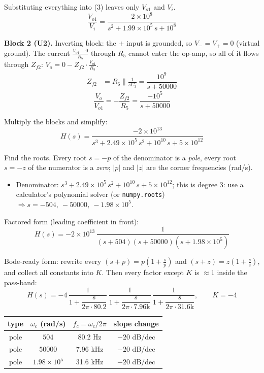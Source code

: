 \documentclass[11pt]{article}
\newcommand{\solstep}[2]{\par\medskip{\color{stepc}\textbf{Step #1 --- #2}}\par\nopagebreak}
\begin{document}
Substituting everything into (3) leaves only $V_{o1}$ and $V_i$.\[
\frac{V_{o1}}{V_i} = \dfrac{2\times 10^{8}}{s^{2} + 1.99\times 10^{5}\,s + 10^{8}}
\]

\textbf{Block 2 (U2).} Inverting block: the $+$ input is grounded, so $V_- = V_+ = 0$ (virtual ground). The current $\frac{V_{o1} - 0}{R_{5}}$ through $R_{5}$ cannot enter the op-amp, so all of it flows through $Z_{f2}$: $V_{o} = 0 - Z_{f2}\cdot\frac{V_{o1}}{R_{5}}$.\begin{align*}
Z_{f2} &= R_{6} \parallel \frac{1}{sC_{3}} = \dfrac{10^{9}}{s + 50000}
\end{align*}
\[
\frac{V_{o}}{V_{o1}} = -\frac{Z_{f2}}{R_{5}} = \dfrac{-10^{5}}{s + 50000}
\]

Multiply the blocks and simplify:\[
H(s) = \dfrac{-2\times 10^{13}}{s^{3} + 2.49\times 10^{5}\,s^{2} + 10^{10}\,s + 5\times 10^{12}}
\]

\solstep{5}{Standard (Bode-ready) form}Find the roots. Every root $s=-p$ of the denominator is a \emph{pole}, every root $s=-z$ of the numerator is a \emph{zero}; $|p|$ and $|z|$ are the corner frequencies (rad/s).
\begin{itemize}[leftmargin=*,itemsep=2pt]
\item Denominator: $s^{3} + 2.49\times 10^{5}\,s^{2} + 10^{10}\,s + 5\times 10^{12}$; this is degree 3: use a calculator's polynomial solver (or \texttt{numpy.roots}) $\Rightarrow s = -504,\ -50000,\ -1.98\times 10^{5}$.
\end{itemize}

Factored form (leading coefficient in front):
\[
H(s) = -2\times 10^{13}\,\dfrac{1}{(s+504)(s+50000)(s+1.98\times 10^{5})}
\]

Bode-ready form: rewrite every $(s+p) = p\left(1+\frac{s}{p}\right)$ and $(s+z) = z\left(1+\frac{s}{z}\right)$, and collect all constants into $K$. Then every factor except $K$ is $\approx 1$ inside the pass-band:
\[
H(s) = -4\,\dfrac{1}{1+\dfrac{s}{2\pi\cdot 80.2}}\,\dfrac{1}{1+\dfrac{s}{2\pi\cdot 7.96\mathrm{k}}}\,\dfrac{1}{1+\dfrac{s}{2\pi\cdot 31.6\mathrm{k}}},\qquad K = -4
\]

\begin{center}\renewcommand{\arraystretch}{1.35}
\begin{tabular}{cccc}
\toprule
type & $\omega_c$ (rad/s) & $f_c=\omega_c/2\pi$ & slope change \\
\midrule
pole & $504$ & 80.2 Hz & $-20$ dB/dec \\
pole & $50000$ & 7.96 kHz & $-20$ dB/dec \\
pole & $1.98\times 10^{5}$ & 31.6 kHz & $-20$ dB/dec \\
\bottomrule
\end{tabular}\end{center}
\end{document}
